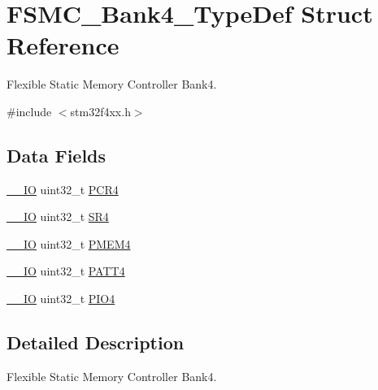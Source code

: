 \hypertarget{struct_f_s_m_c___bank4___type_def}{\section{F\-S\-M\-C\-\_\-\-Bank4\-\_\-\-Type\-Def Struct Reference}
\label{struct_f_s_m_c___bank4___type_def}
}


Flexible Static Memory Controller Bank4.  




{\ttfamily \#include $<$stm32f4xx.\-h$>$}

\subsection*{Data Fields}
\begin{DoxyCompactItemize}
\item 
\hyperlink{group___c_m_s_i_s__core__definitions_gaec43007d9998a0a0e01faede4133d6be}{\-\_\-\-\_\-\-I\-O} uint32\-\_\-t \hyperlink{struct_f_s_m_c___bank4___type_def_a2f02e7acfbd7e549ede84633215eb6a1}{P\-C\-R4}
\item 
\hyperlink{group___c_m_s_i_s__core__definitions_gaec43007d9998a0a0e01faede4133d6be}{\-\_\-\-\_\-\-I\-O} uint32\-\_\-t \hyperlink{struct_f_s_m_c___bank4___type_def_a8218d6e11dae5d4468c69303dec0b4fc}{S\-R4}
\item 
\hyperlink{group___c_m_s_i_s__core__definitions_gaec43007d9998a0a0e01faede4133d6be}{\-\_\-\-\_\-\-I\-O} uint32\-\_\-t \hyperlink{struct_f_s_m_c___bank4___type_def_a3f82cc749845fb0dd7dfa8121d96b663}{P\-M\-E\-M4}
\item 
\hyperlink{group___c_m_s_i_s__core__definitions_gaec43007d9998a0a0e01faede4133d6be}{\-\_\-\-\_\-\-I\-O} uint32\-\_\-t \hyperlink{struct_f_s_m_c___bank4___type_def_a955cad1aab7fb2d5b6e216cb29b5e7e2}{P\-A\-T\-T4}
\item 
\hyperlink{group___c_m_s_i_s__core__definitions_gaec43007d9998a0a0e01faede4133d6be}{\-\_\-\-\_\-\-I\-O} uint32\-\_\-t \hyperlink{struct_f_s_m_c___bank4___type_def_ac53cd7a08093a4ae8f4de4bcff67a64f}{P\-I\-O4}
\end{DoxyCompactItemize}


\subsection{Detailed Description}
Flexible Static Memory Controller Bank4. 

